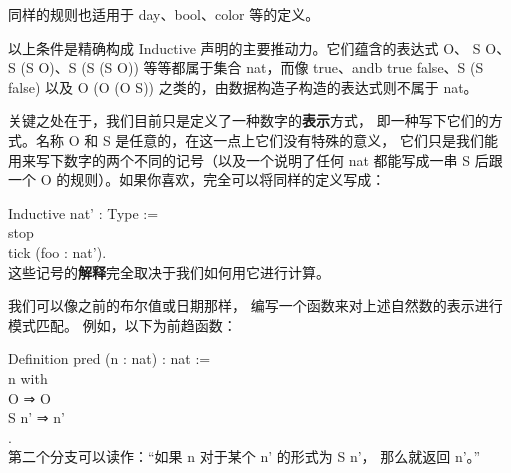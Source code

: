 \documentclass[utf8]{ctexart}
\begin{document}
同样的规则也适用于 {{day}}、{{bool}}、{{color}} 等的定义。

以上条件是精确构成 {{Inductive}} 声明的主要推动力。它们蕴含的表达式
{{O}}、 {{S}} {{O}}、{{S}} {({S}} {{O})}、{{S}} {({S}} {({S}} {{O}))}
等等都属于集合 {{nat}}，而像 {{true}}、{{andb}} {{true}}
{{false}}、{{S}} {({S}} {{false})} 以及 {{O}} {({O}} {({O}} {{S}))}
之类的，由数据构造子构造的表达式则不属于 {{nat}}。

关键之处在于，我们目前只是定义了一种数字的\textbf{表示}方式，
即一种写下它们的方式。名称 {{O}} 和 {{S}}
是任意的，在这一点上它们没有特殊的意义，
它们只是我们能用来写下数字的两个不同的记号（以及一个说明了任何 {{nat}}
都能写成一串 {{S}} 后跟一个 {{O}}
的规则）。如果你喜欢，完全可以将同样的定义写成：

{Inductive} {nat'} : {Type} :=\\
\hspace*{0.333em}\hspace*{0.333em}\textbar{} {stop}\\
\hspace*{0.333em}\hspace*{0.333em}\textbar{} {tick} ({foo} : {nat'}).\\

这些记号的\textbf{解释}完全取决于我们如何用它进行计算。

我们可以像之前的布尔值或日期那样，
编写一个函数来对上述自然数的表示进行模式匹配。 例如，以下为前趋函数：

{Definition} {pred} ({n} : {nat}) : {nat} :=\\
\hspace*{0.333em}\hspace*{0.333em}{match} {n} {with}\\
\hspace*{0.333em}\hspace*{0.333em}\hspace*{0.333em}\hspace*{0.333em}\textbar{}
{O} ⇒ {O}\\
\hspace*{0.333em}\hspace*{0.333em}\hspace*{0.333em}\hspace*{0.333em}\textbar{}
{S} {n'} ⇒ {n'}\\
\hspace*{0.333em}\hspace*{0.333em}{end}.\\

第二个分支可以读作：``如果 {{n}} 对于某个 {{n'}} 的形式为 {{S}} {{n'}}，
那么就返回 {{n'}}。''
\end{document}
